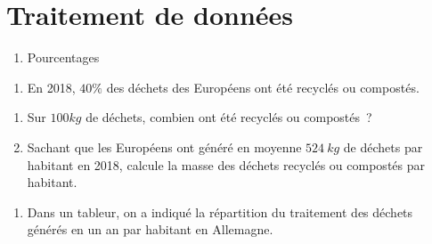 \hypertarget{traitement-de-donnuxe9es}{%
\section{Traitement de données~}\label{traitement-de-donnuxe9es}}

\begin{enumerate}
\def\labelenumi{\arabic{enumi}.}
\setcounter{enumi}{2}
\item
  Pourcentages
\end{enumerate}

\begin{enumerate}
\def\labelenumi{\arabic{enumi}.}
\item
  En 2018, \(40\%\) des déchets des Européens ont été recyclés ou
  compostés.
\end{enumerate}

\begin{enumerate}
\def\labelenumi{\alph{enumi}.}
\item
  Sur \(100kg\) de déchets, combien ont été recyclés ou compostés~?
\item
  Sachant que les Européens ont généré en moyenne \(524\ kg\) de déchets
  par habitant en 2018, calcule la masse des déchets recyclés ou
  compostés par habitant.
\end{enumerate}

\begin{enumerate}
\def\labelenumi{\arabic{enumi}.}
\setcounter{enumi}{1}
\item
  Dans un tableur, on a indiqué la répartition du traitement des déchets
  générés en un an par habitant en Allemagne.
\end{enumerate}

